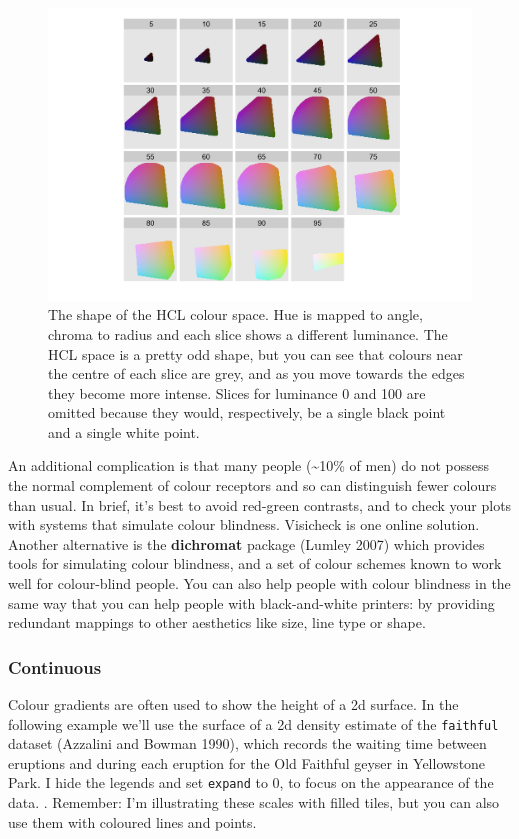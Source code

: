 \begin{figure}[htbp]
  \centering
    \includegraphics[width=\linewidth]{diagrams/hcl-space}
  \caption{The shape of the HCL colour space.  Hue is mapped to angle, chroma to radius and each slice shows a different luminance.  The HCL space is a pretty odd shape, but you can see that colours near the centre of each slice are grey, and as you move towards the edges they become more intense.  Slices for luminance 0 and 100 are omitted because they would, respectively, be a single black point and a single white point.}
  \label{fig:hcl}
\end{figure}

An additional complication is that many people (\textasciitilde{}10\% of
men) do not possess the normal complement of colour receptors and so can
distinguish fewer colours than usual.  In brief,
it's best to avoid red-green contrasts, and to check your plots with
systems that simulate colour blindness. Visicheck is one online
solution. Another alternative is the \textbf{dichromat} package (Lumley
2007) which provides tools for simulating colour blindness, and a set of
colour schemes known to work well for colour-blind people. You can also
help people with colour blindness in the same way that you can help
people with black-and-white printers: by providing redundant mappings to
other aesthetics like size, line type or shape.

\subsubsection{Continuous}\label{ssub:colour-continuous}

Colour gradients are often used to show the height of a 2d surface. In
the following example we'll use the surface of a 2d density estimate of
the \texttt{faithful} dataset (Azzalini and Bowman 1990), which records
the waiting time between eruptions and during each eruption for the Old
Faithful geyser in Yellowstone Park. I hide the legends and set
\texttt{expand} to 0, to focus on the appearance of the data.
 . Remember: I'm
illustrating these scales with filled tiles, but you can also use them
with coloured lines and points.

